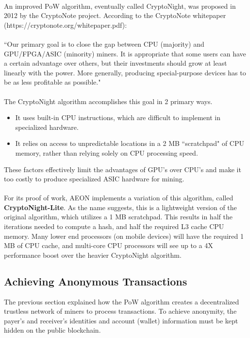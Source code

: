 \\
An improved PoW algorithm, eventually called CryptoNight, was proposed in 2012 by the CryptoNote project. According to the CryptoNote whitepaper (https://cryptonote.org/whitepaper.pdf):\\
\\
“Our primary goal is to close the gap between CPU (majority) and GPU/FPGA/ASIC (minority) miners. It is appropriate that some users can have a certain advantage over others, but their investments should grow at least linearly with the power. More generally, producing special-purpose devices has to be as less profitable as possible."\\
\\
The CryptoNight algorithm accomplishes this goal in 2 primary ways.
\begin{itemize}
	\item It uses built-in CPU instructions, which are difficult to implement in specialized hardware.
	\item It relies on access to unpredictable locations in a 2 MB “scratchpad" of CPU memory, rather than relying solely on CPU processing speed.
\end{itemize}
These factors effectively limit the advantages of GPU's over CPU's and make it too costly to produce specialized ASIC hardware for mining.\\
\\
For its proof of work, AEON implements a variation of this algorithm, called  \textbf{CryptoNight-Lite}. As the name suggests, this is a lightweight version of the original algorithm, which utilizes a 1 MB scratchpad.  This results in half the iterations needed to compute a hash, and half the required L3 cache CPU memory.  Many lower end processors (on mobile devices) will have the required 1 MB of CPU cache, and multi-core CPU processors will see up to a 4X performance boost over the heavier CryptoNight algorithm.

\subsection{Achieving Anonymous Transactions}

The previous section explained how the PoW algorithm creates a decentralized trustless network of miners to process transactions.  To achieve anonymity, the payer's and receiver's identities and account (wallet) information must be kept hidden on the public blockchain.

